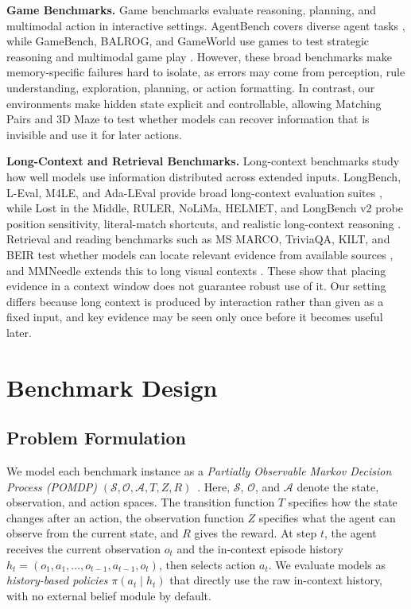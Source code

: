 \documentclass{llmxive}
\begin{document}
\noindent\textbf{Game Benchmarks.} Game benchmarks evaluate reasoning, planning, and multimodal action in interactive settings. AgentBench covers diverse agent tasks \citep{liu2023agentbench}, while GameBench, BALROG, and GameWorld use games to test strategic reasoning and multimodal game play \citep{costarelli2024gamebench,paglieri2024balrog,ouyang2026gameworld}. However, these broad benchmarks make memory-specific failures hard to isolate, as errors may come from perception, rule understanding, exploration, planning, or action formatting. In contrast, our environments make hidden state explicit and controllable, allowing Matching Pairs and 3D Maze to test whether models can recover information that is invisible and use it for later actions.

\noindent\textbf{Long-Context and Retrieval Benchmarks.} Long-context benchmarks study how well models use information distributed across extended inputs. LongBench, L-Eval, M4LE, and Ada-LEval provide broad long-context evaluation suites \citep{bai2023longbench,an2024leval,kwan2024m4le,wang2024adaleval}, while Lost in the Middle, RULER, NoLiMa, HELMET, and LongBench v2 probe position sensitivity, literal-match shortcuts, and realistic long-context reasoning \citep{liu2024lostmiddle,hsieh2024ruler,modarressi2025nolima,yen2025helmet,bai2025longbenchv2}. Retrieval and reading benchmarks such as MS MARCO, TriviaQA, KILT, and BEIR test whether models can locate relevant evidence from available sources \citep{nguyen2016msmarco,joshi2017triviaqa,kwiatkowski2019naturalquestions,yang2018hotpotqa,petroni2021kilt,thakur2021beir}, and MMNeedle extends this to long visual contexts \citep{wang2024mmneedle}. These show that placing evidence in a context window does not guarantee robust use of it. Our setting differs because long context is produced by interaction rather than given as a fixed input, and key evidence may be seen only once before it becomes useful later.
\section{Benchmark Design}
\label{sec:benchmark_design}

\subsection{Problem Formulation}
\label{sec:problem_formulation}

We model each benchmark instance as a \emph{Partially Observable Markov Decision Process (POMDP)} $(\mathcal{S}, \mathcal{O}, \mathcal{A}, T, Z, R)$~\citep{kaelbling1998planning}. Here, $\mathcal{S}$, $\mathcal{O}$, and $\mathcal{A}$ denote the state, observation, and action spaces. The transition function $T$ specifies how the state changes after an action, the observation function $Z$ specifies what the agent can observe from the current state, and $R$ gives the reward. At step $t$, the agent receives the current observation $o_t$ and the in-context episode history $h_t=(o_1,a_1,\ldots,o_{t-1},a_{t-1},o_t)$, then selects action $a_t$. We evaluate models as \emph{history-based policies} $\pi(a_t \mid h_t)$ that directly use the raw in-context history, with no external belief module by default.
\end{document}
